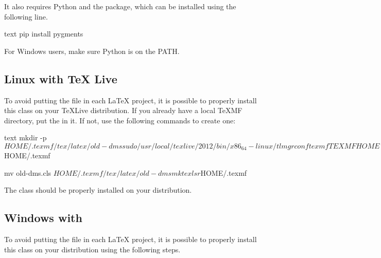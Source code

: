 \documentclass[a4paper, 11pt]{old-dms}
\begin{document}
It also requires Python and the  package, which can be installed using the following line.
\begin{codeboxnonos}{text}
pip install pygments
\end{codeboxnonos}

For Windows users, make sure Python is on the PATH.


\subsection{Linux with \TeX{} Live}

To avoid putting the  file in each \LaTeX{} project, it is possible to properly install this class on your \TeX Live distribution. If you already have a local \TeX MF directory, put the  in it. If not, use the following commands\cite{ref:installation-texlive} to create one:
\begin{codeboxnonos}{text}
mkdir -p $HOME/.texmf/tex/latex/old-dms

sudo /usr/local/texlive/2012/bin/x86_64-linux/tlmgr conf texmf TEXMFHOME $HOME/.texmf

mv old-dms.cls $HOME/.texmf/tex/latex/old-dms

mktexlsr $HOME/.texmf
\end{codeboxnonos}

The class should be properly installed on your distribution.

\subsection{Windows with }

To avoid putting the  file in each \LaTeX{} project, it is possible to properly install this class on your  distribution using the following steps\cite{ref:installation-miktex}. 
\end{document}
